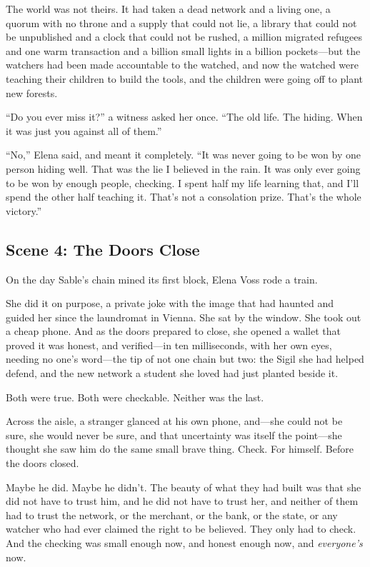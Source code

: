 The world was not theirs. It had taken a dead network and a living one, a quorum with
no throne and a supply that could not lie, a library that could not be unpublished and
a clock that could not be rushed, a million migrated refugees and one warm transaction
and a billion small lights in a billion pockets---but the watchers had been made
accountable to the watched, and now the watched were teaching their children to build
the tools, and the children were going off to plant new forests.

``Do you ever miss it?'' a witness asked her once. ``The old life. The hiding. When it
was just you against all of them.''

``No,'' Elena said, and meant it completely. ``It was never going to be won by one
person hiding well. That was the lie I believed in the rain. It was only ever going to
be won by enough people, checking. I spent half my life learning that, and I'll spend
the other half teaching it. That's not a consolation prize. That's the whole victory.''

\hypertarget{scene-4-the-doors-close}{%
\subsection{Scene 4: The Doors
Close}\label{scene-4-the-doors-close}}

On the day Sable's chain mined its first block, Elena Voss rode a train.

She did it on purpose, a private joke with the image that had haunted and guided her
since the laundromat in Vienna. She sat by the window. She took out a cheap phone. And
as the doors prepared to close, she opened a wallet that proved it was honest, and
verified---in ten milliseconds, with her own eyes, needing no one's word---the tip of
not one chain but two: the Sigil she had helped defend, and the new network a student
she loved had just planted beside it.

Both were true. Both were checkable. Neither was the last.

Across the aisle, a stranger glanced at his own phone, and---she could not be sure, she
would never be sure, and that uncertainty was itself the point---she thought she saw
him do the same small brave thing. Check. For himself. Before the doors closed.

Maybe he did. Maybe he didn't. The beauty of what they had built was that she did not
have to trust him, and he did not have to trust her, and neither of them had to trust
the network, or the merchant, or the bank, or the state, or any watcher who had ever
claimed the right to be believed. They only had to check. And the checking was small
enough now, and honest enough now, and \emph{everyone's} now.

